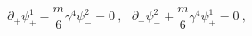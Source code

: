 \begin{equation}
\partial_+ \psi^1_+ - \frac{m}{6} \gamma^4 \psi^2_- = 0 ~,~~~
\partial_- \psi^2_- + \frac{m}{6} \gamma^4 \psi^1_+ = 0 ~,
\label{fpeom}
\end{equation}

